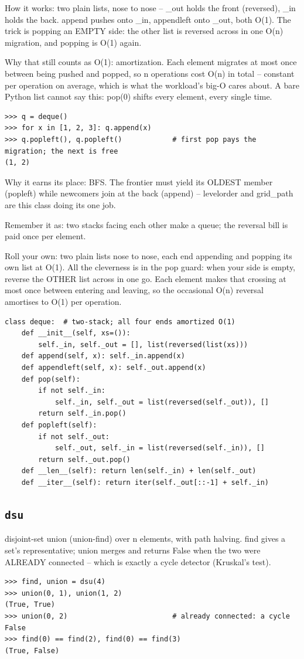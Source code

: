 \documentclass[10pt,letterpaper]{book}
\begin{document}
How it works: two plain lists, nose to nose -- \_out holds the front (reversed), \_in holds the back. append pushes onto \_in, appendleft onto \_out, both O(1). The trick is popping an EMPTY side: the other list is reversed across in one O(n) migration, and popping is O(1) again.


Why that still counts as O(1): amortization. Each element migrates at most once between being pushed and popped, so n operations cost O(n) in total -- constant per operation on average, which is what the workload's big-O cares about. A bare Python list cannot say this: pop(0) shifts every element, every single time.

\begin{lstlisting}[style=ex]
>>> q = deque()
>>> for x in [1, 2, 3]: q.append(x)
>>> q.popleft(), q.popleft()            # first pop pays the migration; the next is free
(1, 2)
\end{lstlisting}

Why it earns its place: BFS. The frontier must yield its OLDEST member (popleft) while newcomers join at the back (append) -- levelorder and grid\_path are this class doing its one job.


Remember it as: two stacks facing each other make a queue; the reversal bill is paid once per element.


Roll your own: two plain lists nose to nose, each end appending and popping its own list at O(1). All the cleverness is in the pop guard: when your side is empty, reverse the OTHER list across in one go. Each element makes that crossing at most once between entering and leaving, so the occasional O(n) reversal amortises to O(1) per operation.

\begin{lstlisting}[style=ex]
class deque:  # two-stack; all four ends amortized O(1)
    def __init__(self, xs=()):
        self._in, self._out = [], list(reversed(list(xs)))
    def append(self, x): self._in.append(x)
    def appendleft(self, x): self._out.append(x)
    def pop(self):
        if not self._in:
            self._in, self._out = list(reversed(self._out)), []
        return self._in.pop()
    def popleft(self):
        if not self._out:
            self._out, self._in = list(reversed(self._in)), []
        return self._out.pop()
    def __len__(self): return len(self._in) + len(self._out)
    def __iter__(self): return iter(self._out[::-1] + self._in)
\end{lstlisting}
\subsection{\texttt{dsu}}\label{def:dsu}
disjoint-set union (union-find) over n elements, with path halving. find gives a set's representative; union merges and returns False when the two were ALREADY connected -- which is exactly a cycle detector (Kruskal's test).
\begin{lstlisting}[style=ex]
>>> find, union = dsu(4)
>>> union(0, 1), union(1, 2)
(True, True)
>>> union(0, 2)                         # already connected: a cycle
False
>>> find(0) == find(2), find(0) == find(3)
(True, False)
\end{lstlisting}
\end{document}
